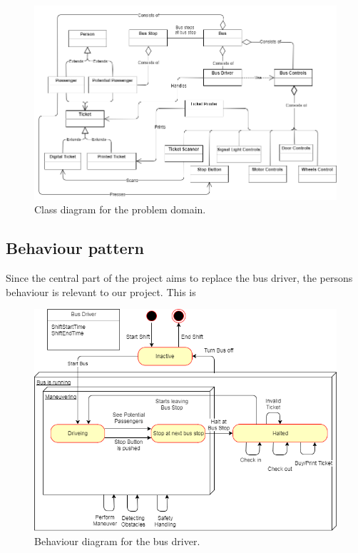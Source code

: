 \begin{figure}[H]
\centering
\includegraphics[scale=0.49]{Images/problem_domain_class_diagram.png}
\caption{Class diagram for the problem domain.}
\label{problem-domain-class-diagram}
\end{figure}


\subsection{Behaviour pattern}

Since the central part of the project aims to replace the bus driver, the persons behaviour is relevant to our project. This is  

\begin{figure}[H]
\centering
\includegraphics[scale=0.6]{Images/BehaviorDiagramBusDriver.png}
\caption{Behaviour diagram for the bus driver.}
\label{BehaviorDiagramBusDriver}
\end{figure}